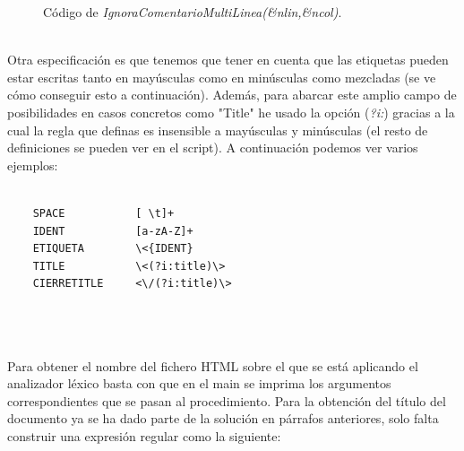 \documentclass[10pt, a4paper,spanish]{article}
\begin{document}
\begin{figure}[H]
  \centering
  \caption{Código de \textit{IgnoraComentarioMultiLinea(&nlin,&ncol)}.}
\end{figure}
 

\newpage
\noindent \\  Otra especificación es que tenemos que tener en cuenta que las etiquetas pueden estar escritas tanto en mayúsculas como en minúsculas como mezcladas (se ve cómo conseguir esto a continuación). Además, para abarcar este amplio campo de posibilidades en casos concretos como "Title"  he usado la opción (\textit{?i:}) gracias a la cual la regla que definas es insensible a mayúsculas y minúsculas (el resto de definiciones se pueden ver en el script). A continuación podemos ver varios ejemplos:

\begin{lstlisting}
    
    SPACE           [ \t]+
    IDENT           [a-zA-Z]+
    ETIQUETA        \<{IDENT}
    TITLE           \<(?i:title)\>
    CIERRETITLE     <\/(?i:title)\>

    
\end{lstlisting}

 \noindent \\ Para obtener el nombre del fichero HTML sobre el que se está aplicando el analizador léxico basta con que en el main se imprima los argumentos correspondientes que se pasan al procedimiento. Para la obtención del título del documento ya se ha dado parte de la solución en párrafos anteriores, solo falta construir una expresión regular como la siguiente:
 
\end{document}

